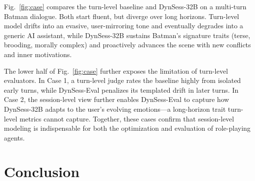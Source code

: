 Fig.~\ref{fig:case} compares the turn-level baseline and DynSess-32B on a multi-turn Batman dialogue.  Both start fluent, but diverge over long horizons. Turn-level model drifts into an evasive, user-mirroring tone and eventually degrades into a generic AI assistant, while DynSess-32B sustains Batman's signature traits (terse, brooding, morally complex) and proactively advances the scene with new conflicts and inner motivations.


The lower half of Fig.~\ref{fig:case} further exposes the limitation of turn-level evaluators. In Case 1, a turn-level judge rates the baseline highly from isolated early turns, while DynSess-Eval penalizes its templated drift in later turns. In Case 2, the session-level view further enables DynSess-Eval to capture how DynSess-32B adapts to the user's evolving emotions—a long-horizon trait turn-level metrics cannot capture. Together, these cases confirm that session-level modeling is indispensable for both the optimization and evaluation of role-playing agents.





\section{Conclusion}


